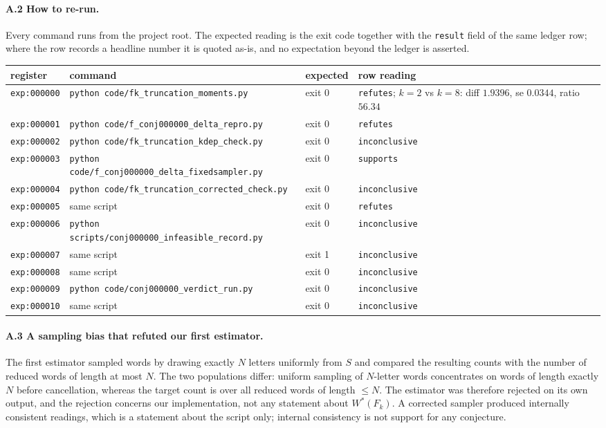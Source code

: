 \documentclass[11pt]{article}
\theoremstyle{plain}
\theoremstyle{definition}
\theoremstyle{remark}
\begin{document}
\paragraph{A.2 How to re-run.} Every command runs from the project root. The expected reading is the exit code together with the \texttt{result} field of the same ledger row; where the row records a headline number it is quoted as-is, and no expectation beyond the ledger is asserted.

\begin{center}\small
\begin{tabular}{@{}llll@{}}
\hline
register & command & expected & row reading \\
\hline
\texttt{exp:000000} & \texttt{python code/fk\_truncation\_moments.py} & exit 0 & \texttt{refutes}; $k=2$ vs $k=8$: diff $1.9396$, se $0.0344$, ratio $56.34$ \\
\texttt{exp:000001} & \texttt{python code/f\_conj000000\_delta\_repro.py} & exit 0 & \texttt{refutes} \\
\texttt{exp:000002} & \texttt{python code/fk\_truncation\_kdep\_check.py} & exit 0 & \texttt{inconclusive} \\
\texttt{exp:000003} & \texttt{python code/f\_conj000000\_delta\_fixedsampler.py} & exit 0 & \texttt{supports} \\
\texttt{exp:000004} & \texttt{python code/fk\_truncation\_corrected\_check.py} & exit 0 & \texttt{inconclusive} \\
\texttt{exp:000005} & same script & exit 0 & \texttt{refutes} \\
\texttt{exp:000006} & \texttt{python scripts/conj000000\_infeasible\_record.py} & exit 0 & \texttt{inconclusive} \\
\texttt{exp:000007} & same script & exit 1 & \texttt{inconclusive} \\
\texttt{exp:000008} & same script & exit 0 & \texttt{inconclusive} \\
\texttt{exp:000009} & \texttt{python code/conj000000\_verdict\_run.py} & exit 0 & \texttt{inconclusive} \\
\texttt{exp:000010} & same script & exit 0 & \texttt{inconclusive} \\
\hline
\end{tabular}
\end{center}

\paragraph{A.3 A sampling bias that refuted our first estimator.} The first estimator sampled words by drawing exactly $N$ letters uniformly from $S$ and compared the resulting counts with the number of reduced words of length at most $N$. The two populations differ: uniform sampling of $N$-letter words concentrates on words of length exactly $N$ before cancellation, whereas the target count is over all reduced words of length $\le N$. The estimator was therefore rejected on its own output, and the rejection concerns our implementation, not any statement about $W^*(F_k)$. A corrected sampler produced internally consistent readings, which is a statement about the script only; internal consistency is not support for any conjecture.
\end{document}
